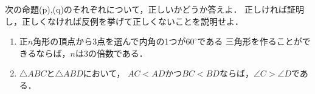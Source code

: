 \documentclass[../../main.tex]{subfiles}
\begin{document}
次の命題(p),(q)のそれぞれについて，正しいかどうか答えよ．
正しければ証明し，正しくなければ反例を挙げて正しくないことを説明せよ．
\begin{enumerate}
  \item[(p)] 正$n$角形の頂点から3点を選んで内角の1つが$60^\circ$である
    三角形を作ることができるならば，$n$は3の倍数である．
  \item[(q)] $\triangle ABC$と$\triangle ABD$において，
    $AC<AD$かつ$BC<BD$ならば，$\angle C > \angle D$である．
\end{enumerate}
\end{document}
